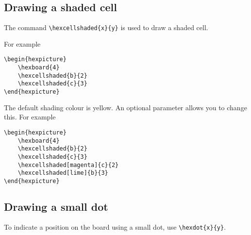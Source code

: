 \documentclass[a4paper,12pt]{article}
\begin{document}
    \begin{hexpicture}
    \end{hexpicture}

    \subsection{Drawing a shaded cell}
    
    The command \verb|\hexcellshaded{x}{y}| is used to draw a shaded cell. 
    
    For example
    
    \begin{verbatim}\begin{hexpicture}
    \hexboard{4}
    \hexcellshaded{b}{2}
    \hexcellshaded{c}{3}
\end{hexpicture}\end{verbatim}
    
    \begin{hexpicture}
    \end{hexpicture}

    The default shading colour is yellow. An optional parameter allows you to change this. For example
    
    \begin{verbatim}\begin{hexpicture}
    \hexboard{4}
    \hexcellshaded{b}{2}
    \hexcellshaded{c}{3}
    \hexcellshaded[magenta]{c}{2}
    \hexcellshaded[lime]{b}{3}
\end{hexpicture}\end{verbatim}
    
    \begin{hexpicture}
    \end{hexpicture}
    
    \subsection{Drawing a small dot}
    
    To indicate a position on the board using a small dot, use \verb|\hexdot{x}{y}|. 
    
\end{document}

